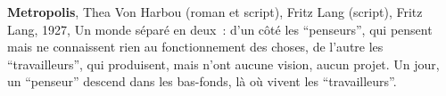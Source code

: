 \begin{thebibliography}{1}
  \textbf{Metropolis},
  Thea Von Harbou (roman et script), Fritz Lang (script), Fritz Lang,
  1927,\newline
  Un monde séparé en deux~: d'un côté les “penseurs”, qui pensent mais ne connaissent rien au fonctionnement des choses, de l'autre les “travailleurs”, qui produisent, mais n'ont aucune vision, aucun projet. Un jour, un “penseur” descend dans les bas-fonds, là où vivent les “travailleurs”.

\end{thebibliography}